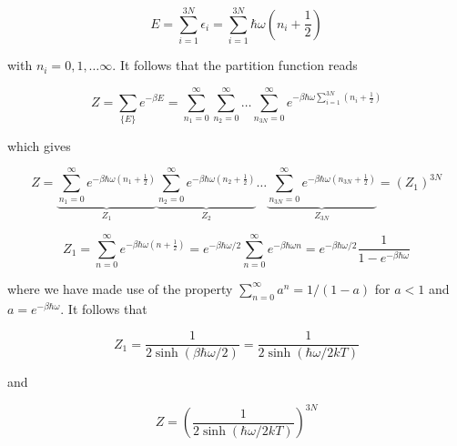 \documentclass[12pt,a4paper]{report}
\newcommand{\esp}{\vspace{0.5cm}}
\begin{document}
\esp

\begin{equation}
	E = \sum_{i=1}^{3N} \epsilon_i = \sum_{i=1}^{3N} \hbar \omega \left( n_i + \frac{1}{2} \right) \tag{5.62}
\end{equation}

\esp

with $n_i = 0, 1, \dots \infty$. It follows that the partition function reads

\esp

\begin{equation}
	Z = \sum_{\{E\}} e^{-\beta E} = \sum_{n_1=0}^{\infty} \sum_{n_2=0}^{\infty} \dots \sum_{n_{3N}=0}^{\infty} e^{-\beta \hbar \omega \sum_{i=1}^{3N} (n_i + \frac{1}{2})} \tag{5.63}
\end{equation}

\esp

which gives

\esp

\begin{equation}
	Z = \underbrace{\sum_{n_1=0}^{\infty} e^{-\beta \hbar \omega (n_1 + \frac{1}{2})}}_{Z_1} \underbrace{\sum_{n_2=0}^{\infty} e^{-\beta \hbar \omega (n_2 + \frac{1}{2})}}_{Z_2} \dots \underbrace{\sum_{n_{3N}=0}^{\infty} e^{-\beta \hbar \omega (n_{3N} + \frac{1}{2})}}_{Z_{3N}} = (Z_1)^{3N} \tag{5.64}
\end{equation}

\esp

\begin{equation}
	Z_1 = \sum_{n=0}^{\infty} e^{-\beta \hbar \omega (n + \frac{1}{2})} = e^{-\beta \hbar \omega / 2} \sum_{n=0}^{\infty} e^{-\beta \hbar \omega n} = e^{-\beta \hbar \omega / 2} \frac{1}{1 - e^{-\beta \hbar \omega}} \tag{5.65}
\end{equation}

\esp

where we have made use of the property $\sum_{n=0}^{\infty} a^n = 1/(1 - a)$ for $a < 1$ and $a = e^{-\beta \hbar \omega}$. It follows that

\esp

\begin{equation}
	Z_1 = \frac{1}{2 \sinh(\beta \hbar \omega / 2)} = \frac{1}{2 \sinh(\hbar \omega / 2kT)} \tag{5.66}
\end{equation}

\esp

and

\esp

\begin{equation}
	Z = \left( \frac{1}{2 \sinh(\hbar \omega / 2kT)} \right)^{3N} \tag{5.67}
\end{equation}
\end{document}
